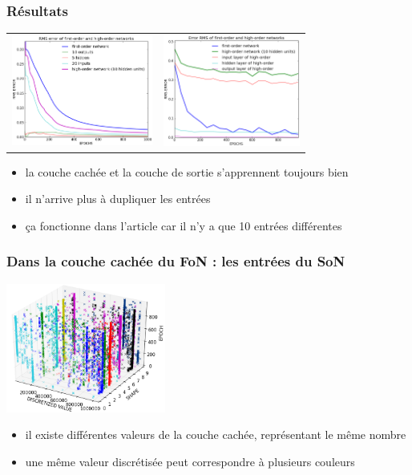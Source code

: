 \documentclass[11pt]{beamer}
\begin{document}
\begin{frame}
  \frametitle{Résultats}
  \begin{center}
  \begin{tabular}{cc}
  \hspace*{-1cm}
   \includegraphics[width=175px]{../cleeremans_2007/digit_reco/rms_ffa.png}
   &
   \hspace*{-0.5cm}
   \includegraphics[width=170px]{../cleeremans_2007/digit_reco/rms_handwritten_ffa.png}
  \end{tabular}
  \end{center}

\begin{itemize}
 \item la couche cachée et la couche de sortie s'apprennent toujours bien
 \item il n'arrive plus à dupliquer les entrées
 \item ça fonctionne dans l'article car il n'y a que 10 entrées différentes
\end{itemize}
\end{frame}


\begin{frame}
  \frametitle{Dans la couche cachée du FoN : les entrées du SoN}
  \begin{center}
   \includegraphics[height=160px]{../cleeremans_2007/digit_reco/discretize_minhand.png}
  \end{center}

\begin{itemize}
 \item il existe différentes valeurs de la couche cachée, représentant le même nombre
 \item une même valeur discrétisée peut correspondre à  plusieurs couleurs
\end{itemize}
\end{frame}
\end{document}
